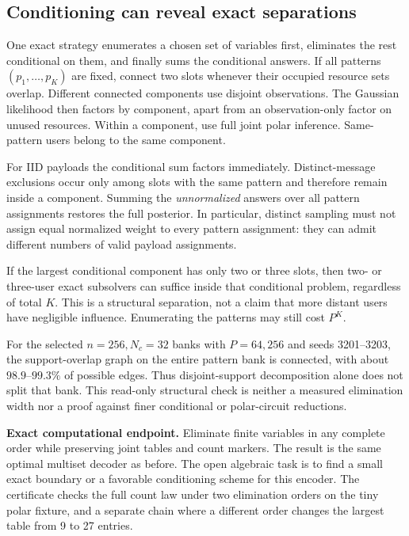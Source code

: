 \documentclass[10pt,a4paper]{article}
\begin{document}
\subsection{Conditioning can reveal exact separations}
One exact strategy enumerates a chosen set of variables first, eliminates the rest conditional on them, and
finally sums the conditional answers. If all patterns $(p_1,\ldots,p_K)$ are fixed, connect two slots whenever
their occupied resource sets overlap. Different connected components use disjoint observations.
The Gaussian likelihood then factors by component, apart from an observation-only factor on unused resources.
Within a component, use full joint polar inference. Same-pattern users belong to the same component.

For IID payloads the conditional sum factors immediately. Distinct-message exclusions occur only among slots
with the same pattern and therefore remain inside a component. Summing the \emph{unnormalized} answers over
all pattern assignments restores the full posterior. In particular, distinct sampling must not assign equal
normalized weight to every pattern assignment: they can admit different numbers of valid payload assignments.

If the largest conditional component has only two or three slots, then two- or three-user exact subsolvers can
suffice inside that conditional problem, regardless of total $K$. This is a structural separation, not a claim
that more distant users have negligible influence. Enumerating the patterns may still cost $P^K$.

For the selected $n=256,N_c=32$ banks with $P=64,256$ and seeds 3201--3203, the support-overlap graph on the
entire pattern bank is connected, with about $98.9$--$99.3\%$ of possible edges.
Thus disjoint-support decomposition alone does not split that bank. This read-only structural check is neither
a measured elimination width nor a proof against finer conditional or polar-circuit reductions.

\textbf{Exact computational endpoint.} Eliminate finite variables in any complete order while preserving
joint tables and count markers. The result is the same optimal multiset decoder as before.
The open algebraic task is to find a small exact boundary or a favorable conditioning scheme for this encoder.
The certificate checks the full count law under two elimination orders on the tiny polar fixture, and a
separate chain where a different order changes the largest table from 9 to 27 entries.

\clearpage
\end{document}
